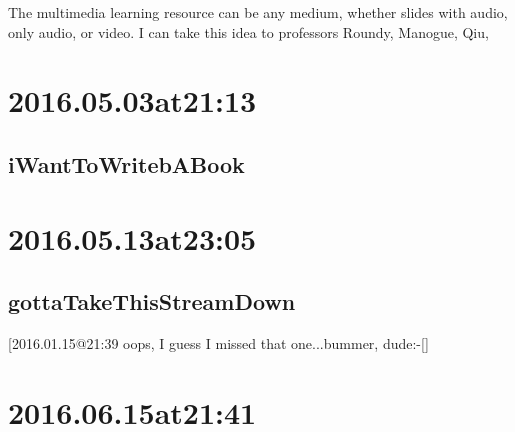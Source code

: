 The multimedia learning resource can be any medium, whether slides with audio, only audio, or video. I can take this idea to professors Roundy, Manogue, Qiu, 

\section*{2016.05.03at21:13}
\subsection*{iWantToWritebABook}

\section*{ 2016.05.13at23:05 }
\subsection*{ gottaTakeThisStreamDown }
[2016.01.15@21:39 oops, I guess I missed that one...bummer, dude:-[]


\section*{ 2016.06.15at21:41 }
